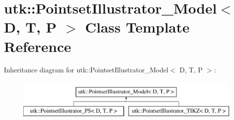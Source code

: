 \hypertarget{classutk_1_1PointsetIllustrator__Model}{\section{utk\-:\-:Pointset\-Illustrator\-\_\-\-Model$<$ D, T, P $>$ Class Template Reference}
\label{classutk_1_1PointsetIllustrator__Model}
}
Inheritance diagram for utk\-:\-:Pointset\-Illustrator\-\_\-\-Model$<$ D, T, P $>$\-:\begin{figure}[H]
\begin{center}
\leavevmode
\includegraphics[height=2.000000cm]{classutk_1_1PointsetIllustrator__Model}
\end{center}
\end{figure}
